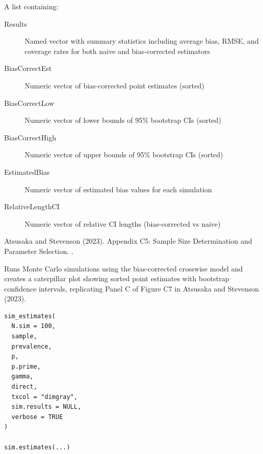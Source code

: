 \documentclass[a4paper]{book}
\begin{document}
%
\begin{Value}
A list containing:
\begin{description}

\item[Results] Named vector with summary statistics including average bias,
RMSE, and coverage rates for both naive and bias-corrected estimators
\item[BiasCorrectEst] Numeric vector of bias-corrected point estimates (sorted)
\item[BiasCorrectLow] Numeric vector of lower bounds of 95\% bootstrap CIs (sorted)
\item[BiasCorrectHigh] Numeric vector of upper bounds of 95\% bootstrap CIs (sorted)
\item[EstimatedBias] Numeric vector of estimated bias values for each simulation
\item[RelativeLengthCI] Numeric vector of relative CI lengths (bias-corrected vs naive)

\end{description}

\end{Value}
%
\begin{References}
Atsusaka and Stevenson (2023). Appendix C5: Sample Size Determination
and Parameter Selection. .
\end{References}
%
\begin{Examples}
\end{Examples}
%
\begin{Description}
Runs Monte Carlo simulations using the bias-corrected crosswise model and
creates a caterpillar plot showing sorted point estimates with bootstrap
confidence intervals, replicating Panel C of Figure C7 in Atsusaka and
Stevenson (2023).
\end{Description}
%
\begin{Usage}
\begin{verbatim}
sim_estimates(
  N.sim = 100,
  sample,
  prevalence,
  p,
  p.prime,
  gamma,
  direct,
  txcol = "dimgray",
  sim.results = NULL,
  verbose = TRUE
)

sim.estimates(...)
\end{verbatim}
\end{Usage}
\end{document}
